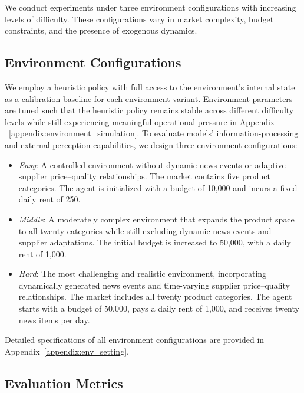 We conduct experiments under three environment configurations with increasing levels of difficulty. These configurations vary in market 
complexity, budget constraints, and the presence of exogenous dynamics.


\subsection{Environment Configurations}


We employ a heuristic policy with full access to the environment’s internal state as a calibration baseline for each environment variant. Environment parameters are tuned such that the heuristic policy remains stable across different difficulty levels while still experiencing meaningful operational pressure in Appendix ~\ref{appendix:environment_simulation}. To evaluate models' information-processing and external perception capabilities, we design three environment configurations:
\begin{itemize}[leftmargin=*]
    \item \textit{Easy}: A controlled environment without dynamic news events or adaptive supplier price--quality relationships. The market contains five product categories. The agent is initialized with a budget of 10{,}000 and incurs a fixed daily rent of 250.
    \item \textit{Middle}: A moderately complex environment that expands the product space to all twenty categories while still excluding dynamic news events and supplier adaptations. The initial budget is increased to 50{,}000, with a daily rent of 1{,}000.
    \item \textit{Hard}: The most challenging and realistic environment, incorporating dynamically generated news events and time-varying supplier price--quality relationships. The market includes all twenty product categories. The agent starts with a budget of 50{,}000, pays a daily rent of 1{,}000, and receives twenty news items per day.
\end{itemize}
Detailed specifications of all environment configurations are provided in Appendix~\ref{appendix:env_setting}.

\subsection{Evaluation Metrics}


